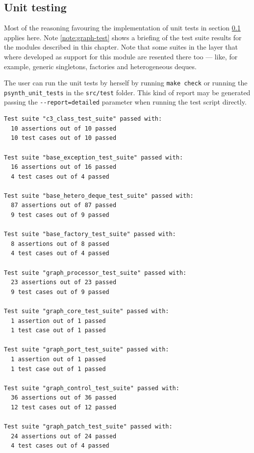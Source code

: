 \subsection{Unit testing}
\label{sec:sound-unittest}

Most of the reasoning favouring the implementation of unit tests in
section \ref{sec:sound-unittest} applies here. Note
\ref{note:graph-test} shows a briefing of the test suite results for
the modules described in this chapter. Note that some suites in the
 layer that where developed as support for this module are
resented there too --- like, for example, generic singletons,
factories and heterogeneous deques.

\begin{mynote}
\label{note:graph-test}
The user can run the unit tests by herself by running \texttt{make
  check} or running the \texttt{psynth\_unit\_tests} in the
\texttt{src/test} folder. This kind of report may be generated passing
the \verb|--report=detailed| parameter when running the test script
directly.  {\small
\begin{verbatim}
Test suite "c3_class_test_suite" passed with:
  10 assertions out of 10 passed
  10 test cases out of 10 passed

Test suite "base_exception_test_suite" passed with:
  16 assertions out of 16 passed
  4 test cases out of 4 passed

Test suite "base_hetero_deque_test_suite" passed with:
  87 assertions out of 87 passed
  9 test cases out of 9 passed

Test suite "base_factory_test_suite" passed with:
  8 assertions out of 8 passed
  4 test cases out of 4 passed

Test suite "graph_processor_test_suite" passed with:
  23 assertions out of 23 passed
  9 test cases out of 9 passed

Test suite "graph_core_test_suite" passed with:
  1 assertion out of 1 passed
  1 test case out of 1 passed

Test suite "graph_port_test_suite" passed with:
  1 assertion out of 1 passed
  1 test case out of 1 passed

Test suite "graph_control_test_suite" passed with:
  36 assertions out of 36 passed
  12 test cases out of 12 passed

Test suite "graph_patch_test_suite" passed with:
  24 assertions out of 24 passed
  4 test cases out of 4 passed
\end{verbatim}
}
\end{mynote}


